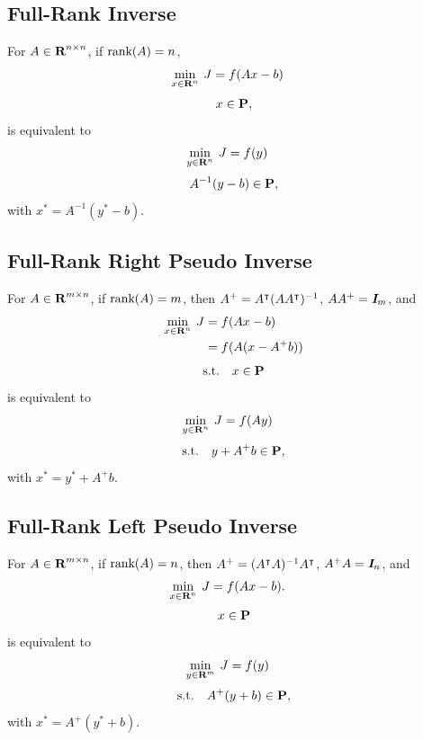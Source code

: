 \documentclass{article}
\begin{document}
\subsection{Full-Rank Inverse}

    For $A\in\textbf{R}^{n\times n}$, if $\text{rank}(A)=n$,
    \begin{align*}
            \min_{x\in\textbf{R}^n}\:J
        &=
            f(A x - b)
    \end{align*}
    \begin{align*}
        x\in\textbf{P},
    \end{align*}
    is equivalent to
    \begin{align*}
        \min_{y\in\textbf{R}^n}\:J
        &=
            f(y)
    \end{align*}
    \begin{align*}
        A^{-1}(y-b)\in\textbf{P},
    \end{align*}
    with $x^*=A^{-1}(y^*-b)$.
    
\subsection{Full-Rank Right Pseudo Inverse}

    For $A\in\textbf{R}^{m\times n}$, if $\text{rank}(A)=m$, then
    $A^+ = A^\intercal(AA^\intercal)^{-1}$, $AA^+=\emph{\textbf{I}}_m$, and
    \begin{align*}
            \min_{x\in\textbf{R}^n}\:J
        &=
            f(A x - b)
        \\
        &=f(A (x - A^+b))
    \end{align*}
    \begin{align*}
        \text{s.t.}\quad x\in\textbf{P}
    \end{align*}
    is equivalent to
    \begin{align*}
        \min_{y\in\textbf{R}^n}\:J
    &= f(Ay)
    \end{align*}
    \begin{align*}
    \text{s.t.}\quad y+A^+b\in\textbf{P},
    \end{align*}
    with $x^*=y^*+A^+b$.  

\subsection{Full-Rank Left Pseudo Inverse}

    For $A\in\textbf{R}^{m\times n}$, if $\text{rank}(A)=n$, then
    $A^+ = (A^\intercal A)^{-1} A^\intercal$, $A^+A=\emph{\textbf{I}} _n$, and
    \begin{align*}
            \min_{x\in\textbf{R}^n}\:J
        &=
            f(A x - b).
    \end{align*}
    \begin{align*}
        x\in\textbf{P}
    \end{align*}
    is equivalent to
    \begin{align*}
        \min_{y\in\textbf{R}^m}\:J
    &= f(y)
    \end{align*}
    \begin{align*}
        \text{s.t.}\quad A^+(y+b)\in\textbf{P},
    \end{align*}
    with $x^*=A^+(y^*+b)$.
\end{document}
